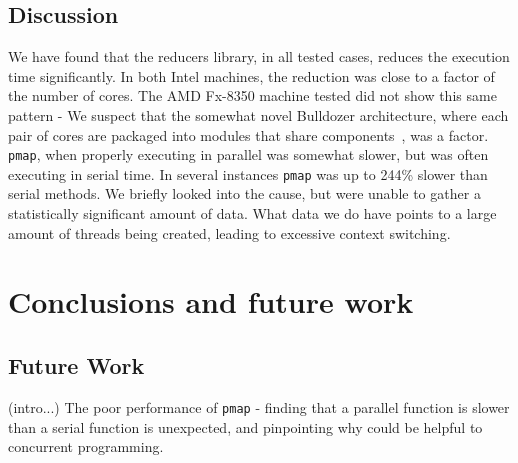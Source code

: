 \documentclass[12pt]{article}
\newcommand{\clocode}[1]{{\texttt {#1}}}
\begin{document}
\subsection{Discussion}\label{sec:discussion}
We have found that the reducers library, in all tested cases, reduces the execution time significantly. In both Intel machines, the reduction was close to a factor of the number of cores. The AMD Fx-8350 machine tested did not show this same pattern - We suspect that the somewhat novel Bulldozer architecture, where each pair of cores are packaged into modules that share components~\cite{McIntyre:2012},  was a factor. \clocode{pmap}, when properly executing in parallel was somewhat slower, but was often executing in serial time. In several instances \clocode{pmap} was up to 244\% slower than serial methods. We briefly looked into the cause, but were unable to gather a statistically significant amount of data. What data we do have points to a large amount of threads being created, leading to excessive context switching. 

\section{Conclusions and future work}\label{sec:conclusion}




\subsection{Future Work}\label{sec:future}
(intro...) The poor performance of \clocode{pmap} - finding that a parallel function is slower than a serial function is unexpected, and pinpointing why could be helpful to concurrent programming.







%
%




%  
%
%










\end{document}
